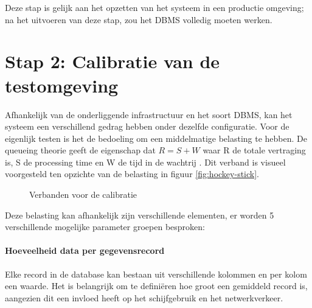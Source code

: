 Deze stap is gelijk aan het opzetten van het systeem in een productie omgeving; na het uitvoeren van deze stap, zou het DBMS volledig moeten werken. 

\section{Stap 2: Calibratie van de testomgeving}
Afhankelijk van de onderliggende infrastructuur en het soort DBMS, kan het systeem een verschillend gedrag hebben onder dezelfde configuratie. Voor de eigenlijk testen is het de bedoeling om een middelmatige belasting te hebben. De queueing theorie geeft de eigenschap dat $R = S + W$ waar R de totale vertraging is, S de processing time en W de tijd in de wachtrij \cite{millsap2003optimizing}. Dit verband is visueel voorgesteld ten opzichte van de belasting in figuur \ref{fig:hockey-stick}. 

\begin{figure}[ht!] 
\centering
	\hfill
	\caption{Verbanden voor de calibratie}
\end{figure}
Deze belasting kan afhankelijk zijn verschillende elementen, er worden 5 verschillende mogelijke parameter groepen besproken:

\paragraph{Hoeveelheid data per gegevensrecord} Elke record in de database kan bestaan uit verschillende kolommen en per kolom een waarde. Het is belangrijk om te definiëren hoe groot een gemiddeld record is, aangezien dit een invloed heeft op het schijfgebruik en het netwerkverkeer.   

